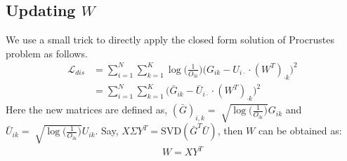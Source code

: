\documentclass[letterpaper]{article} %
\begin{document}
\subsection{Updating $W$}
We use a small trick to directly apply the closed form solution of Procrustes problem as follows.
\begin{align}
\mathcal{L}_{dis} &= \sum\limits_{i=1}^N \sum\limits_{k=1}^K \log\Big({\frac{1}{O_{3i}}}\Big) \Big(G_{ik} - U_{i\cdot} \cdot (W^T)_{\cdot k}\Big)^2 \nonumber \\
&= \sum\limits_{i=1}^N \sum\limits_{k=1}^K \Big(\bar{G}_{ik} - \bar{U}_{i\cdot} \cdot (W^T)_{\cdot k}\Big)^2
\end{align}
Here the new matrices are defined as, $(\bar{G})_{i,k} = \sqrt[]{\log\Big({\frac{1}{O_{3i}}}\Big)} G_{ik}$ and $\bar{U}_{ik} = \sqrt[]{\log\Big({\frac{1}{O_{3i}}}\Big)} U_{ik}$. Say, $X \Sigma Y^T = \text{SVD}(\bar{G}^T \bar{U})$, then $W$ can be obtained as:
\begin{align}\label{eq:W}
\boxed{
W = XY^T
}
\end{align}
\end{document}
